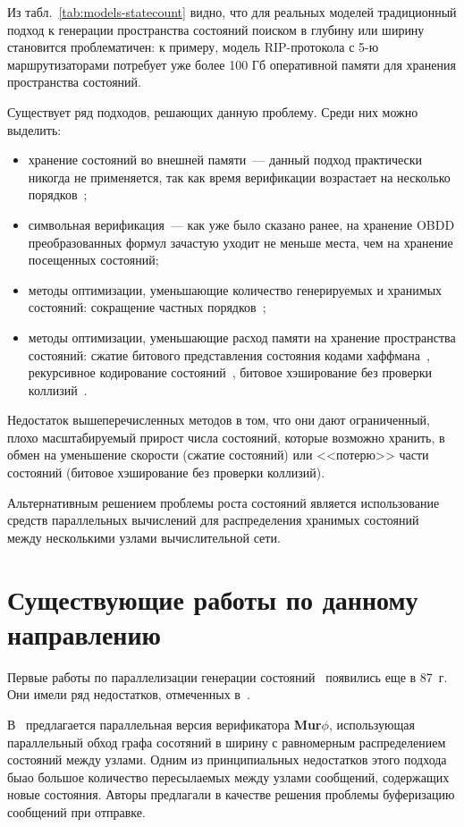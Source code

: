 \documentclass[a4paper,notitlepage,14pt]{article}
\begin{document}
Из табл.~\ref{tab:models-statecount} видно, что для реальных моделей традиционный подход к
генерации пространства состояний поиском в глубину или ширину становится проблематичен: к
примеру, модель RIP-протокола с 5-ю маршрутизаторами потребует уже более 100 Гб
оперативной памяти для хранения пространства состояний.

Существует ряд подходов, решающих данную проблему. Среди них можно выделить:

\begin{itemize}
\item хранение состояний во внешней памяти~--- данный подход практически никогда не
  применяется, так как время верификации возрастает на несколько порядков~\cite{Clarke};
\item символьная верификация~--- как уже было сказано ранее, на хранение OBDD
  преобразованных формул зачастую уходит не меньше места, чем на хранение посещенных
  состояний;
\item методы оптимизации, уменьшающие количество генерируемых и хранимых состояний:
  сокращение частных порядков~\cite{POD};
\item методы оптимизации, уменьшающие расход памяти на хранение пространства состояний:
  сжатие битового представления состояния кодами хаффмана~\cite{StateCompr}, рекурсивное
  кодирование состояний~\cite{StateCompr}, битовое хэширование без проверки
  коллизий~\cite{BitHash1,Wolper}.
\end{itemize}

Недостаток вышеперечисленных методов в том, что они дают ограниченный, плохо
масштабируемый прирост числа состояний, которые возможно хранить, в обмен на уменьшение
скорости (сжатие состояний) или <<потерю>> части состояний (битовое хэширование без
проверки коллизий).

Альтернативным решением проблемы роста состояний является использование средств
параллельных вычислений для распределения хранимых состояний между несколькими узлами
вычислительной сети.

\section{Существующие работы по данному направлению}
\label{sec:other-work}

Первые работы по параллелизации генерации состояний~\cite{Aggarwal87} появились еще в
87~г. Они имели ряд недостатков, отмеченных в~\cite{Stern97parallelizingthe}.

В~\cite{Stern97parallelizingthe} предлагается параллельная версия верификатора
\textbf{Mur$\phi$}, использующая параллельный обход графа сосотяний в ширину с равномерным
распределением состояний между узлами. Одним из принципиальных недостатков этого подхода
быао большое количество пересылаемых между узлами сообщений, содержащих новые
состояния. Авторы предлагали в качестве решения проблемы буферизацию сообщений при
отправке.
\end{document}
